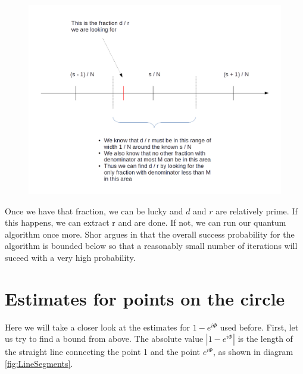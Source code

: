 \documentclass[a4paper, draft]{article}
\theoremstyle{own}
\theoremstyle{remark}
\begin{document}
\begin{figure}[ht]
\centering
\includegraphics[width=1.0\linewidth]{images/ShorContinuedFraction}
\caption[Locating the fraction d / r]{}
\label{fig:ShorContinuedFraction}
\end{figure}


Once we have that fraction, we can be lucky and $d$ and $r$ are relatively prime. If this happens, we can extract r and are done. If not, we can run our quantum algorithm once more. Shor argues in \cite{Shor96} that the overall success probability for the algorithm is bounded below so that a reasonably small number of iterations will suceed with a very high probability. 


\appendix
	
\section{Estimates for points on the circle}

Here we will take a closer look at the estimates for $1 - e^{i\Phi}$ used before. First, let us try to find a bound from above. The absolute value $| 1 - e^{i\Phi}|$ is the length of the straight line connecting the point 1 and the point $e^{i\Phi}$, as shown in diagram \ref{fig:LineSegments}.
\end{document}
